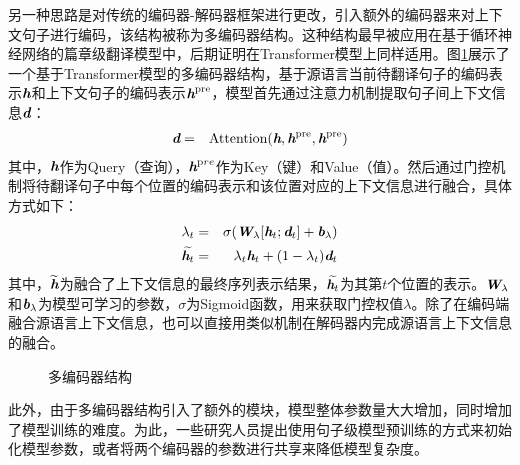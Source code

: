 \parinterval 另一种思路是对传统的编码器-解码器框架进行更改，引入额外的编码器来对上下文句子进行编码，该结构被称为多编码器结构。这种结构最早被应用在基于循环神经网络的篇章级翻译模型中，后期证明在Transformer模型上同样适用。图\ref{fig:17-18}展示了一个基于Transformer模型的多编码器结构，基于源语言当前待翻译句子的编码表示$\textbf{\em h}$和上下文句子的编码表示$\textbf{\em h}^{\textrm {pre}}$，模型首先通过注意力机制提取句子间上下文信息$\textbf{\em d}$：
\begin{eqnarray}
\textbf{\em d}&=&\textrm{Attention}(\textbf{\em h},\textbf{\em h}^{\textrm {pre}},\textbf{\em h}^{\textrm {pre}})
\label{eq:17-3-3}
\end{eqnarray}
其中，$\textbf{\em h}$作为Query（查询），$\textbf{\em h}^{\textrm pre}$作为Key（键）和Value（值）。然后通过门控机制将待翻译句子中每个位置的编码表示和该位置对应的上下文信息进行融合，具体方式如下：
\begin{eqnarray}
\lambda_{t}&=&\sigma(\textbf{\em W}_{\lambda}[\textbf{\em h}_{t};\textbf{\em d}_{t}]+\textbf{\em b}_{\lambda})
\label{eq:17-3-5}\\
\widetilde{\textbf{\em h}_{t}}&=&\lambda_{t}\textbf{\em h}_{t}+(1-\lambda_{t})\textbf{\em d}_{t}
\label{eq:17-3-4}
\end{eqnarray}
其中，$\widetilde{\textbf{\em h}}$为融合了上下文信息的最终序列表示结果，$\widetilde{\textbf{\em h}_{t}}$为其第$t$个位置的表示。$\textbf{\em W}_{\lambda}$和$\textbf{\em b}_{\lambda}$为模型可学习的参数，$\sigma$为Sigmoid函数，用来获取门控权值$\lambda$。除了在编码端融合源语言上下文信息，也可以直接用类似机制在解码器内完成源语言上下文信息的融合。

\begin{figure}[htp]
    \centering
	
    \caption{多编码器结构}
    \label{fig:17-18}
\end{figure}

\parinterval 此外，由于多编码器结构引入了额外的模块，模型整体参数量大大增加，同时增加了模型训练的难度。为此，一些研究人员提出使用句子级模型预训练的方式来初始化模型参数，或者将两个编码器的参数进行共享来降低模型复杂度。

